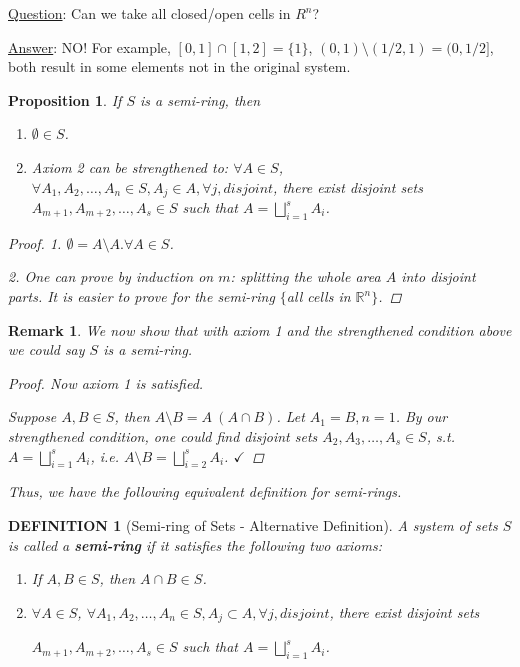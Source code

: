 \documentclass[12pt]{article}
\theoremstyle{blueplain}
\newtheorem{proposition}[theorem]{Proposition}
\theoremstyle{bluedef}
\newtheorem{definition}{DEFINITION}[section]
\theoremstyle{blueremark}
\newtheorem{remark}{Remark}[section]
\newcommand{\R}{\mathbb{R}}
\numberwithin{equation}{section}
\begin{document}
      \underline{Question}: Can we take all closed/open cells in $R^n$?

      \underline{Answer}: NO! For example, $[0,1] \cap [1,2] = \{1\}$, $(0,1) \setminus (1/2,1) = (0,1/2]$, both result in some elements not in the original system.

\begin{proposition}
  If $S$ is a semi-ring, then
  \begin{enumerate}
    \item $\emptyset \in S$.
    \item Axiom 2 can be strengthened to: $\forall A \in S$, $\forall A_1, A_2, \ldots, A_n \in S, A_j \in A, \forall j, disjoint$, there exist disjoint sets $A_{m+1}, A_{m+2}, \ldots, A_s \in S$ such that $A = \bigsqcup_{i=1}^s A_i$.
  \end{enumerate}
  \begin{proof}
    1. $\emptyset = A \setminus A. \forall A \in S$.

    2. One can prove by induction on $m$: splitting the whole area $A$ into disjoint parts. It is easier to prove for the semi-ring $\{$all cells in $\R^n\}$.
  \end{proof}
\end{proposition}

\begin{remark}
  We now show that with axiom 1 and the strengthened condition above we could say $S$ is a semi-ring.
  \begin{proof}
    Now axiom 1 is satisfied.

    Suppose $A, B \in S$, then $A \setminus B = A \ (A \cap B)$. Let $A_1 = B, n = 1$. By our strengthened condition, one could find disjoint sets $A_2, A_3, \ldots, A_s \in S$, s.t. $A = \bigsqcup_{i=1}^s A_i$, i.e. $A \setminus B = \bigsqcup_{i=2}^s A_i$. $\checkmark$
  \end{proof}
  Thus, we have the following equivalent definition for semi-rings.
\end{remark}

\begin{definition}[Semi-ring of Sets - Alternative Definition]

  A system of sets $S$ is called a \textbf{semi-ring} if it satisfies the following two axioms:
  \begin{enumerate}
    \item If $A, B \in S$, then $A \cap B \in S$.
    \item $\forall A \in S$, $\forall A_1, A_2, \ldots, A_n \in S, A_j \subset A, \forall j, disjoint$, there exist disjoint sets

          $A_{m+1}, A_{m+2}, \ldots, A_s \in S$ such that $A = \bigsqcup_{i=1}^s A_i$.
  \end{enumerate}
\end{definition}
\end{document}
